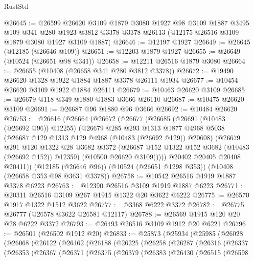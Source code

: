 \begin{lexlean}{RustStd}
\begin{coremodule}
@26645 := @26599
    @26620
    @3109
    @1879
    @3080
    @1927
    @98
    @3109
    @1887
    @3495
    @109
    @341
    @280
    @1923
    @3812
    @3378
    @3378
    @26113
    (@12175 @26516 @3109 @1879 @3080 @1927 @3109 @1887)
@26646 := @12197 @1927
@26649 := @26645 (@12185 (@26646 @109))
@26651 := @12203 @1879 @1927
@26655 := @26649 (@10524 (@26651 @98 @341))
@26658 := @12211 @26516 @1879 @3080
@26664 := @26655 (@10408 (@26658 @341 @280 @3812 @3378))
@26672 := @19490 @26620 @1328 @1922 @1884 @1887 @3378 @26111 @1934
@26677 := @10454 @26620 @3109 @1922 @1884 @26111
@26679 := @10463 @26620 @3109
@26685 := @26679 @118 @349 @1880 @1883 @3666 @26110
@26687 := @10475 @26620 @3109
@26691 := @26687 @96 @1880 @96 @3666
@26692 := @10484 @26620
@26753 := @26616
    (@26664
      (@26672
        (@26677
          (@26685
            (@26691 (@10483 (@26692 @96)) @12255)
            (@26679
              @285
              @293
              @1313
              @1877
              @4968
              @5038
              (@26687 @129 @1313 @129 @4968 (@10483 (@26692 @129)) @20608)
              (@26679
                @291
                @120
                @1322
                @28
                @3682
                @3372
                (@26687 @152 @1322 @152 @3682 (@10483 (@26692 @152)) @12359)
                (@10500 @26620 @3109)))))
        @20402
        @20405
        @20408
        @20411))
    (@12185 (@26646 @96))
    (@10524 (@26651 @1298 @353))
    (@10408 (@26658 @353 @98 @3631 @3378))
@26758 := @10542 @26516 @1919 @1887 @3378 @6223
@26763 := @12390 @26516 @3109 @1919 @1887 @6223
@26771 := @20311 @26516 @3109 @267 @1915 @1322 @20 @3622 @6222
@26775 := @26570 @1917 @1322 @1512 @3622
@26777 := @3368 @6222 @3372
@26782 := @26775 @26777 (@26578 @3622 @26581 @12117)
@26788 := @26569 @1915 @120 @20 @28 @6222 @3372
@26793 := @26493 @26516 @3109 @1912 @20 @6221
@26796 := @26501 (@26502 @1912 @20)
@26833 := @25873
    (@25934
      (@25985
        (@26028
          (@26068
            (@26122
              (@26162
                (@26188
                  (@26225
                    (@26258
                      (@26287
                        (@26316
                          (@26337
                            (@26353
                              (@26367
                                (@26371
                                  (@26375
                                    (@26379
                                      (@26383
                                        (@26430
                                          (@26515
                                            (@26598

\end{coremodule}
\end{lexlean}
